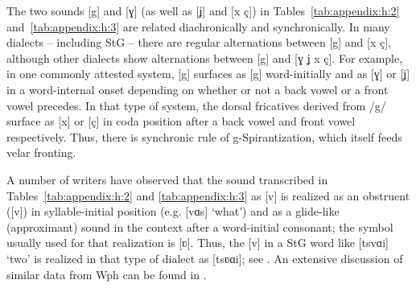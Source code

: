 The two sounds [g] and [ɣ] (as well as [ʝ] and [x ç]) in Tables~\ref{tab:appendix:h:2} and~\ref{tab:appendix:h:3} are related diachronically and synchronically. In many dialects -- including StG -- there are regular alternations between [g] and [x ç], although other dialects show alternations between [g] and [ɣ ʝ x ç]. For example, in one commonly attested system, [g] surfaces as [g] word-initially and as [ɣ] or [ʝ] in a word-internal onset depending on whether or not a back vowel or a front vowel precedes. In that type of system, the dorsal fricatives derived from /g/ surface as [x] or [ç] in coda position after a back vowel and front vowel respectively. Thus, there is synchronic rule of g-Spirantization, which itself feeds velar fronting.

A number of writers have observed that the sound transcribed in Tables~\ref{tab:appendix:h:2} and \ref{tab:appendix:h:3} as [v] is realized as an obstruent ([v]) in syllable-initial position (e.g. [vɑs] ‘what’) and as a glide-like (approximant) sound in the context after a word-initial consonant; the symbol usually used for that realization is [ʋ]. Thus, the [v] in a StG word like [tsvɑi] ‘two’ is realized in that type of dialect as [tsʋɑi]; see \citet[235--242]{Wiese1996a}. An extensive discussion of similar data from Wph can be found in \citet{Hall2014c}.

